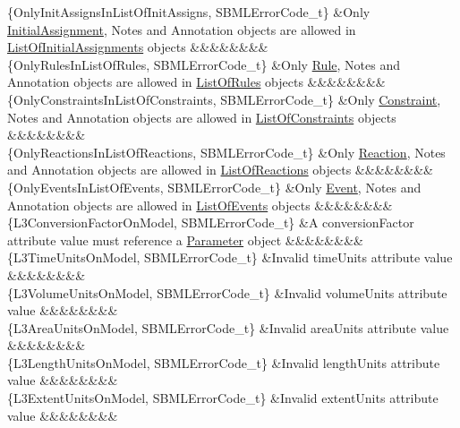 \begin{DoxyParagraph}{}
\begin{longtabu}
\{Only\+Init\+Assigns\+In\+List\+Of\+Init\+Assigns, S\+B\+M\+L\+Error\+Code\+\_\+t\} &Only \hyperlink{class_initial_assignment}{Initial\+Assignment}, Notes and Annotation objects are allowed in \hyperlink{class_list_of_initial_assignments}{List\+Of\+Initial\+Assignments} objects &&&&&&&&\\
\{Only\+Rules\+In\+List\+Of\+Rules, S\+B\+M\+L\+Error\+Code\+\_\+t\} &Only \hyperlink{class_rule}{Rule}, Notes and Annotation objects are allowed in \hyperlink{class_list_of_rules}{List\+Of\+Rules} objects &&&&&&&&\\
\{Only\+Constraints\+In\+List\+Of\+Constraints, S\+B\+M\+L\+Error\+Code\+\_\+t\} &Only \hyperlink{class_constraint}{Constraint}, Notes and Annotation objects are allowed in \hyperlink{class_list_of_constraints}{List\+Of\+Constraints} objects &&&&&&&&\\
\{Only\+Reactions\+In\+List\+Of\+Reactions, S\+B\+M\+L\+Error\+Code\+\_\+t\} &Only \hyperlink{class_reaction}{Reaction}, Notes and Annotation objects are allowed in \hyperlink{class_list_of_reactions}{List\+Of\+Reactions} objects &&&&&&&&\\
\{Only\+Events\+In\+List\+Of\+Events, S\+B\+M\+L\+Error\+Code\+\_\+t\} &Only \hyperlink{class_event}{Event}, Notes and Annotation objects are allowed in \hyperlink{class_list_of_events}{List\+Of\+Events} objects &&&&&&&&\\
\{L3\+Conversion\+Factor\+On\+Model, S\+B\+M\+L\+Error\+Code\+\_\+t\} &A \textquotesingle{}conversion\+Factor\textquotesingle{} attribute value must reference a \hyperlink{class_parameter}{Parameter} object &&&&&&&&\\
\{L3\+Time\+Units\+On\+Model, S\+B\+M\+L\+Error\+Code\+\_\+t\} &Invalid \textquotesingle{}time\+Units\textquotesingle{} attribute value &&&&&&&&\\
\{L3\+Volume\+Units\+On\+Model, S\+B\+M\+L\+Error\+Code\+\_\+t\} &Invalid \textquotesingle{}volume\+Units\textquotesingle{} attribute value &&&&&&&&\\
\{L3\+Area\+Units\+On\+Model, S\+B\+M\+L\+Error\+Code\+\_\+t\} &Invalid \textquotesingle{}area\+Units\textquotesingle{} attribute value &&&&&&&&\\
\{L3\+Length\+Units\+On\+Model, S\+B\+M\+L\+Error\+Code\+\_\+t\} &Invalid \textquotesingle{}length\+Units\textquotesingle{} attribute value &&&&&&&&\\
\{L3\+Extent\+Units\+On\+Model, S\+B\+M\+L\+Error\+Code\+\_\+t\} &Invalid \textquotesingle{}extent\+Units\textquotesingle{} attribute value &&&&&&&&\\

\end{longtabu}
\end{DoxyParagraph}
